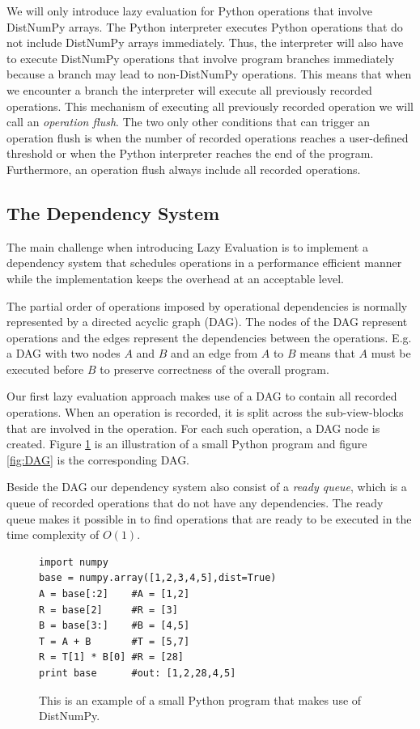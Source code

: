 \documentclass[preprint]{../PGAS10/sigplanconf}
\begin{document}
We will only introduce lazy evaluation for Python operations that involve DistNumPy arrays. The Python interpreter executes Python operations that do not include DistNumPy arrays immediately. Thus, the interpreter will also have to execute DistNumPy operations that involve program branches immediately because a branch may lead to non-DistNumPy operations. This means that when we encounter a branch the interpreter will execute all previously recorded operations. This mechanism of executing all previously recorded operation we will call an \emph{operation flush}. The two only other conditions that can trigger an operation flush is when the number of recorded operations reaches a user-defined threshold or when the Python interpreter reaches the end of the program. Furthermore, an operation flush always include all recorded operations.


\subsection{The Dependency System}
The main challenge when introducing Lazy Evaluation is to implement a dependency system that schedules operations in a performance efficient manner while the implementation keeps the overhead at an acceptable level.

The partial order of operations imposed by operational dependencies is normally represented by a directed acyclic graph (DAG)\cite{AhSeUl86}. The nodes of the DAG represent operations and the edges represent the dependencies between the operations. E.g. a DAG with two nodes $A$ and $B$ and an edge from $A$ to $B$ means that $A$ must be executed before $B$ to preserve correctness of the overall program. 

Our first lazy evaluation approach makes use of a DAG to contain all recorded operations. When an operation is recorded, it is split across the sub-view-blocks that are involved in the operation. For each such operation, a DAG node is created. Figure \ref{lst:code_eg}  is an illustration of a small Python program and figure \ref{fig:DAG} is the corresponding DAG.
 
Beside the DAG our dependency system also consist of a \emph{ready queue}, which is a queue of recorded operations that do not have any dependencies. The ready queue makes it possible in to find operations that are ready to be executed in the time complexity of $O(1)$.

\begin{figure}
\begin{lstlisting}
import numpy
base = numpy.array([1,2,3,4,5],dist=True)
A = base[:2]    #A = [1,2]
R = base[2]     #R = [3]
B = base[3:]    #B = [4,5]
T = A + B       #T = [5,7]
R = T[1] * B[0] #R = [28]
print base      #out: [1,2,28,4,5]
\end{lstlisting}
 \caption{This is an example of a small Python program that makes use of DistNumPy.}
 \label{lst:code_eg}
\end{figure}
\end{document}

